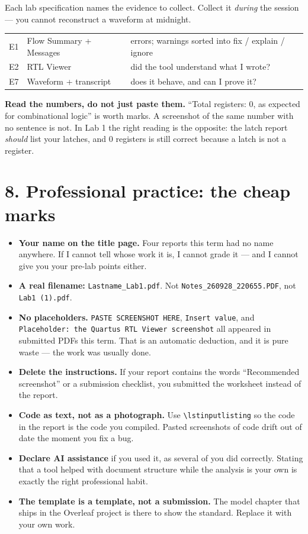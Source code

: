 \documentclass[11pt]{article}
\newcommand{\code}[1]{\texttt{#1}}
\begin{document}
Each lab specification names the evidence to collect. Collect it \emph{during} the
session --- you cannot reconstruct a waveform at midnight.

\begin{center}
\begin{tabular}{ll>{\raggedright\arraybackslash}p{8.0cm}}
\toprule
E1 & Flow Summary + Messages & 0 errors; warnings sorted into fix / explain / ignore \\
E2 & RTL Viewer & did the tool understand what I wrote? \\
E7 & Waveform + transcript & does it behave, and can I prove it? \\
\bottomrule
\end{tabular}
\end{center}

\textbf{Read the numbers, do not just paste them.} ``Total registers: 0, as expected
for combinational logic'' is worth marks. A screenshot of the same number with no
sentence is not. In Lab 1 the right reading is the opposite: the latch report
\emph{should} list your latches, and 0 registers is still correct because a latch is
not a register.

\section*{8. Professional practice: the cheap marks}

\begin{itemize}[leftmargin=1.6em,itemsep=2pt]
\item \textbf{Your name on the title page.} Four reports this term had no name
anywhere. If I cannot tell whose work it is, I cannot grade it --- and I cannot give
you your pre-lab points either.
\item \textbf{A real filename:} \code{Lastname\_Lab1.pdf}. Not
\code{Notes\_260928\_220655.PDF}, not \code{Lab1 (1).pdf}.
\item \textbf{No placeholders.} \code{PASTE SCREENSHOT HERE}, \code{Insert value},
and \code{Placeholder: the Quartus RTL Viewer screenshot} all appeared in submitted
PDFs this term. That is an automatic deduction, and it is pure waste --- the work
was usually done.
\item \textbf{Delete the instructions.} If your report contains the words
``Recommended screenshot'' or a submission checklist, you submitted the worksheet
instead of the report.
\item \textbf{Code as text, not as a photograph.} Use
\code{\textbackslash lstinputlisting} so the code in the report is the code you
compiled. Pasted screenshots of code drift out of date the moment you fix a bug.
\item \textbf{Declare AI assistance} if you used it, as several of you did
correctly. Stating that a tool helped with document structure while the analysis is
your own is exactly the right professional habit.
\item \textbf{The template is a template, not a submission.} The model chapter that
ships in the Overleaf project is there to show the standard. Replace it with your
own work.
\end{itemize}
\end{document}
